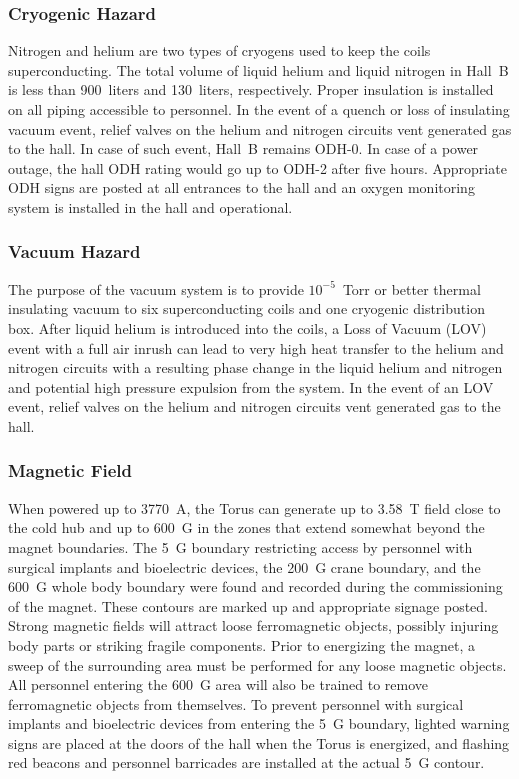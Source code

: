 \subsubsection{Cryogenic Hazard}

Nitrogen and helium are two types of cryogens used to keep the coils superconducting. The 
total volume of liquid helium and liquid nitrogen in Hall~B is less than 900~liters and 
130~liters, respectively. Proper insulation is installed on all piping accessible to 
personnel. In the event of a quench or loss of insulating vacuum event, relief valves on 
the helium and nitrogen circuits vent generated gas to the hall. In case of such event, 
Hall~B remains ODH-0. In case of a power outage, the hall ODH rating would go up to ODH-2 
after five hours. Appropriate ODH signs are posted at all entrances to the hall and an 
oxygen monitoring system is installed in the hall and operational.

\subsubsection{Vacuum Hazard}

The purpose of the vacuum system is to provide $10^{-5}$~Torr or better thermal insulating 
vacuum to six superconducting coils and one cryogenic distribution box. After liquid helium 
is introduced into the coils, a Loss of Vacuum (LOV) event with a full air inrush can lead to
very high heat transfer to the helium and nitrogen circuits with a resulting phase change in 
the liquid helium and nitrogen and potential high pressure expulsion from the system. In the 
event of an LOV event, relief valves on the helium and nitrogen circuits vent generated
gas to the hall.

\subsubsection{Magnetic Field}

When powered up to 3770~A, the Torus can generate up to 3.58~T field close to the cold hub 
and up to 600~G in the zones that extend somewhat beyond the magnet boundaries. The 5~G 
boundary restricting access by personnel with surgical implants and bioelectric devices, the
200~G crane boundary, and the 600~G whole body boundary were found and recorded during the 
commissioning of the magnet. These contours are marked up and appropriate signage posted.
Strong magnetic fields will attract loose ferromagnetic objects, possibly injuring body parts 
or striking fragile components. Prior to energizing the magnet, a sweep of the surrounding 
area must be performed for any loose magnetic objects. All personnel entering the 600~G area 
will also be trained to remove ferromagnetic objects from themselves. To prevent personnel with 
surgical implants and bioelectric devices from entering the 5~G boundary, lighted warning signs 
are placed at the doors of the hall when the Torus is energized, and flashing red beacons
and personnel barricades are installed at the actual 5~G contour.

